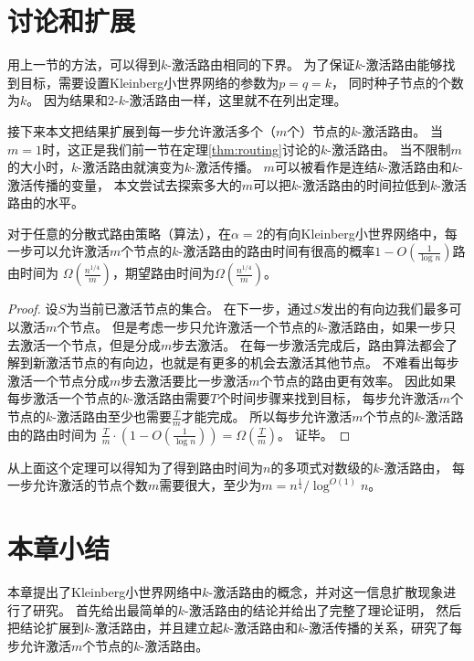 \section{讨论和扩展}
用上一节的方法，可以得到$k$-激活路由相同的下界。
为了保证$k$-激活路由能够找到目标，需要设置Kleinberg小世界网络的参数为$p = q = k$，
同时种子节点的个数为$k$。
因为结果和$2$-$k$-激活路由一样，这里就不在列出定理。


接下来本文把结果扩展到每一步允许激活多个（$m$个）节点的$k$-激活路由。
当$m=1$时，这正是我们前一节在定理\ref{thm:routing}讨论的$k$-激活路由。
当不限制$m$的大小时，$k$-激活路由就演变为$k$-激活传播。
$m$可以被看作是连结$k$-激活路由和$k$-激活传播的变量，
本文尝试去探索多大的$m$可以把$k$-激活路由的时间拉低到$k$-激活路由的水平。




\begin{theorem}
对于任意的分散式路由策略（算法），在$\alpha = 2$的有向Kleinberg小世界网络中，每一步可以允许激活$m$个节点的$k$-激活路由的路由时间有很高的概率$1-O(\frac{1}{\log n})$路由时间为
$\Omega(\frac{n^{1/4}}{m})$，期望路由时间为$\Omega(\frac{n^{1/4}}{m})$。
\end{theorem}

\begin{proof}
设$S$为当前已激活节点的集合。
在下一步，通过$S$发出的有向边我们最多可以激活$m$个节点。
但是考虑一步只允许激活一个节点的$k$-激活路由，如果一步只去激活一个节点，但是分成$m$步去激活。
在每一步激活完成后，路由算法都会了解到新激活节点的有向边，也就是有更多的机会去激活其他节点。
不难看出每步激活一个节点分成$m$步去激活要比一步激活$m$个节点的路由更有效率。
因此如果每步激活一个节点的$k$-激活路由需要$T$个时间步骤来找到目标，
每步允许激活$m$个节点的$k$-激活路由至少也需要$\frac{T}{m}$才能完成。
所以每步允许激活$m$个节点的$k$-激活路由的路由时间为
$\frac{T}{m} \cdot (1-O(\frac{1}{\log n})) = \Omega(\frac{T}{m})$。
证毕。
\end{proof}

从上面这个定理可以得知为了得到路由时间为$n$的多项式对数级的$k$-激活路由，
每一步允许激活的节点个数$m$需要很大，至少为$m = n^{\frac{1}{4}} / \log^{O(1)} n$。

\section{本章小结}

本章提出了Kleinberg小世界网络中$k$-激活路由的概念，并对这一信息扩散现象进行了研究。
首先给出最简单的$k$-激活路由的结论并给出了完整了理论证明，
然后把结论扩展到$k$-激活路由，并且建立起$k$-激活路由和$k$-激活传播的关系，研究了每步允许激活$m$个节点的$k$-激活路由。

